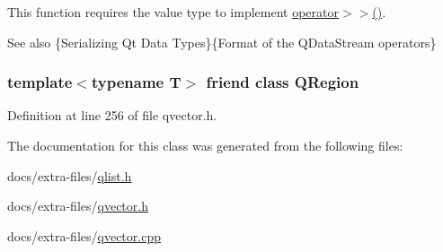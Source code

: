 This function requires the value type to implement {\ttfamily \hyperlink{class_q_vector_aa3718549b9b553556b654f6e00aaa914}{operator$>$$>$()}}.

\begin{DoxySeeAlso}{See also}
\{Serializing Qt Data Types\}\{Format of the Q\+Data\+Stream operators\} 
\end{DoxySeeAlso}
\subsubsection[{\texorpdfstring{Q\+Region}{QRegion}}]{\setlength{\rightskip}{0pt plus 5cm}template$<$typename T$>$ friend class Q\+Region\hspace{0.3cm}{\ttfamily [friend]}}\hypertarget{class_q_vector_a3c463c91639ee085a365c4bf70fcbe31}{}\label{class_q_vector_a3c463c91639ee085a365c4bf70fcbe31}


Definition at line 256 of file qvector.\+h.



The documentation for this class was generated from the following files\+:\begin{DoxyCompactItemize}
\item 
docs/extra-\/files/\hyperlink{qlist_8h}{qlist.\+h}\item 
docs/extra-\/files/\hyperlink{qvector_8h}{qvector.\+h}\item 
docs/extra-\/files/\hyperlink{qvector_8cpp}{qvector.\+cpp}\end{DoxyCompactItemize}
